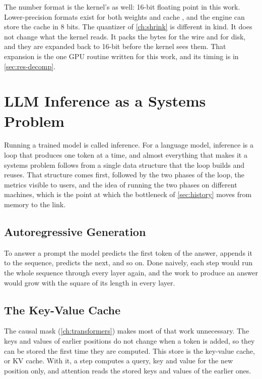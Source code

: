 The number format is the kernel's as well: 16-bit floating point in this
work. Lower-precision formats exist for both weights and cache
\citep{rouhani2023mx,micikevicius2018}, and the engine can store the cache in
8 bits. The quantizer of \cref{ch:shrink} is different in kind. It does not
change what the kernel reads. It packs the bytes for the wire and for disk,
and they are expanded back to 16-bit before the kernel sees them. That
expansion is the one GPU routine written for this work, and its timing is
in \cref{sec:res-decomp}.

\section{LLM Inference as a Systems Problem}
\label{ch:inference}

Running a trained model is called inference. For a language model, inference
is a loop that produces one token at a time, and almost everything that makes
it a systems problem follows from a single data structure that the loop
builds and reuses. That structure comes first, followed by the two phases
of the loop, the metrics visible to users, and the idea of running the two
phases on different machines, which is the point at which the bottleneck
of \cref{sec:history} moves from memory to the link.

\subsection{Autoregressive Generation}

To answer a prompt the model predicts the first token of the answer, appends
it to the sequence, predicts the next, and so on. Done naively, each step
would run the whole sequence through every layer again, and the work to
produce an answer would grow with the square of its length in every layer.

\subsection{The Key-Value Cache}

The causal mask (\cref{ch:transformers}) makes most of that work unnecessary.
The keys and values of earlier positions do not change when a token is added,
so they can be stored the first time they are computed. This store is the
key-value cache, or KV cache. With it, a step computes a query, key and value
for the new position only, and attention reads the stored keys and values of
the earlier ones.

